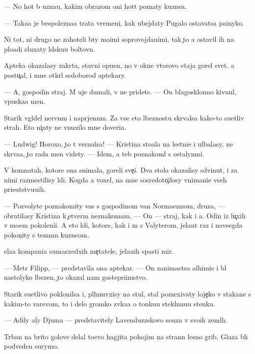 \documentclass[10pt]{book}
\begin{document}
— No hot{\ia} b{\yi} uzna{\y}u, kakim obrazom oni hot{\ia}t po{\y}maty kuzne{\q}a.

— Taka{\y}a je bespolezna{\y}a trata vremeni, kak ubejdaty Pugalo ostavatsa pa{\y}inyko{\y}.

Ni tot, ni drugo{\y} ne zahoteli b{\yi}ty mo{\y}imi soprovojda{\y}u{\x}imi, tak {\c}to {\y}a ostavil ih na plo{\x}adi sluxaty l{\iu}dsku{\y}u boltovn{\iu}.

Apteka okazalasy zakr{\yi}ta, stavni opu{\x}en{\yi}, no v okne vtorovo etaja gorel svet. {\Y}a postu{\c}al, i mne otkr{\yi}l sedoborod{\yi}{\y} aptekary.

— A, gospodin straj. M{\yi} uje dumali, v{\yi} ne pridete. — On blagosklonno kivnul, vpuska{\y}a men{\ia}.

Starik v{\yi}gl{\ia}del nervn{\yi}m i napr{\ia}jenn{\yi}m. Za vse{\y} eto{\y} l{\iu}beznost{\y}u skr{\yi}valsa kako{\y}-to su{\y}etliv{\yi}{\y} strah. Eto ni{\c}uty ne vnuxilo mne doveri{\y}a.

— Ludwig! Horoxo, {\c}to t{\yi} vernulsa! — Kristina sto{\y}ala na lestni{\q}e i ul{\yi}balasy, ne skr{\yi}va{\y}a, {\c}to rada men{\ia} videty. — Idem, {\y}a teb{\ia} poznakoml{\iu} s ostalyn{\yi}mi.

V komnatah, kotor{\yi}{\y}e ona snimala, goreli sve{\c}i. Dva stola okazalisy sdvinut{\yi}, i za nimi razmestilisy l{\iu}di. Kogda {\y}a voxel, na mne sosredoto{\c}ilosy vnimani{\y}e vseh prisutstvu{\y}u{\x}ih.

— Pozvolyte poznakomity vas s gospodinom van Norma{\y}ennom, druz{\y}a, — obratilasy Kristina k {\c}etver{\yi}m neznakom{\q}am. — On — straj, kak i {\y}a. Odin iz lu{\c}xih v mo{\y}em pokoleni{\y}i. A eto l{\iu}di, kotor{\yi}{\y}e, kak i m{\yi} s Valyterom, jela{\y}ut raz i navsegda pokon{\c}ity s temn{\yi}m kuzne{\q}om.

{\Q}ela{\y}a kompani{\y}a sumasxedxih me{\c}tatele{\y}, jela{\y}u{\x}ih spasti mir.

— Metr Filipp, — predstavila ona aptekar{\ia}. — On zanima{\y}etsa alhimi{\y}e{\y} i b{\yi}l nastolyko l{\iu}bezen, {\c}to okazal nam gostepri{\y}imstvo.

Starik su{\y}etlivo poklonilsa i, pl{\iu}hnuvxisy na stul, stal pomexivaty loje{\c}ko{\y} v stakane s kakim-to varevom, to i delo gromko zv{\ia}ka{\y}a o tonku{\y}u stekl{\ia}nnu{\y}u stenku.

— Adily aly Djuma — predstavitely Lavenduzzskovo so{\y}uza v svo{\y}ih zeml{\ia}h.

T{\iu}rban na brito{\y} golove delal to{\x}evo hagjita pohojim na strann{\yi}{\y} lesno{\y} grib. Glaza b{\yi}li podveden{\yi} surymo{\y}.
\end{document}
